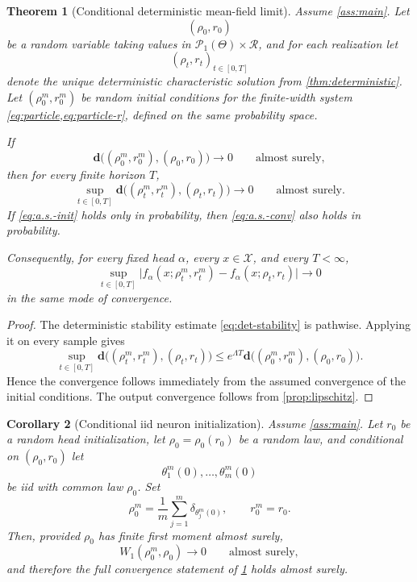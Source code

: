 \documentclass[11pt]{article}
\newtheorem{theorem}{Theorem}[section]
\newtheorem{corollary}[theorem]{Corollary}
\theoremstyle{definition}
\newcommand{\PP}{\mathcal{P}}
\newcommand{\W}{W_1}
\begin{document}
\begin{theorem}[Conditional deterministic mean-field limit]
\label{thm:conditional}
Assume \cref{ass:main}. Let
\[
  (\rho_0,r_0)
\]
be a random variable taking values in $\PP_1(\Theta)\times\mathcal R$, and for each realization let
\[
  (\rho_t,r_t)_{t\in[0,T]}
\]
denote the unique deterministic characteristic solution from \cref{thm:deterministic}. Let $(\rho_0^m,r_0^m)$ be random initial conditions for the finite-width system \cref{eq:particle,eq:particle-r}, defined on the same probability space.

If
\begin{equation}
  \mathbf d\bigl((\rho_0^m,r_0^m),(\rho_0,r_0)\bigr)\to 0
  \qquad
  \text{almost surely},
  \label{eq:a.s.-init}
\end{equation}
then for every finite horizon $T$,
\begin{equation}
  \sup_{t\in[0,T]}
  \mathbf d\bigl((\rho_t^m,r_t^m),(\rho_t,r_t)\bigr)\to 0
  \qquad
  \text{almost surely}.
  \label{eq:a.s.-conv}
\end{equation}
If \eqref{eq:a.s.-init} holds only in probability, then \eqref{eq:a.s.-conv} also holds in probability.

Consequently, for every fixed head $\alpha$, every $x\in\mathcal X$, and every $T<\infty$,
\begin{equation}
  \sup_{t\in[0,T]}
  \bigl|
    f_\alpha(x;\rho_t^m,r_t^m)-f_\alpha(x;\rho_t,r_t)
  \bigr|
  \to 0
  \label{eq:output-conv-random}
\end{equation}
in the same mode of convergence.
\end{theorem}

\begin{proof}
The deterministic stability estimate \eqref{eq:det-stability} is pathwise. Applying it on every sample gives
\[
  \sup_{t\in[0,T]}
  \mathbf d\bigl((\rho_t^m,r_t^m),(\rho_t,r_t)\bigr)
  \le
  e^{\Lambda T}
  \mathbf d\bigl((\rho_0^m,r_0^m),(\rho_0,r_0)\bigr).
\]
Hence the convergence follows immediately from the assumed convergence of the initial conditions. The output convergence follows from \cref{prop:lipschitz}.
\end{proof}

\begin{corollary}[Conditional iid neuron initialization]
\label{cor:conditional-iid}
Assume \cref{ass:main}. Let $r_0$ be a random head initialization, let $\rho_0=\rho_0(r_0)$ be a random law, and conditional on $(\rho_0,r_0)$ let
\[
  \theta_1^m(0),\dots,\theta_m^m(0)
\]
be iid with common law $\rho_0$. Set
\[
  \rho_0^m=\frac1m\sum_{j=1}^m \delta_{\theta_j^m(0)},
  \qquad
  r_0^m=r_0.
\]
Then, provided $\rho_0$ has finite first moment almost surely,
\[
  \W(\rho_0^m,\rho_0)\to 0
  \qquad
  \text{almost surely},
\]
and therefore the full convergence statement of \cref{thm:conditional} holds almost surely.
\end{corollary}
\end{document}
